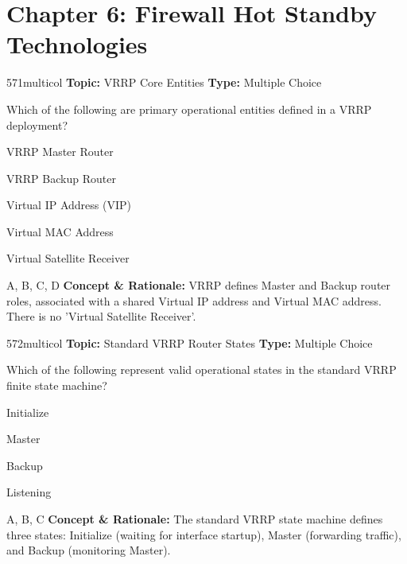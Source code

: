 \section{Chapter 6: Firewall Hot Standby Technologies}

\begin{qcard}{571}{multicol}
\textcolor{darkslate!75}{\small\textbf{Topic:} VRRP Core Entities \hfill \textbf{Type:} Multiple Choice}\vspace{0.4em}\par
Which of the following are primary operational entities defined in a VRRP deployment?
\begin{qoptions}
\item VRRP Master Router
\item VRRP Backup Router
\item Virtual IP Address (VIP)
\item Virtual MAC Address
\item Virtual Satellite Receiver
\end{qoptions}
\end{qcard}
\nopagebreak
\begin{explainbox}{A, B, C, D}
\textbf{Concept \& Rationale:} VRRP defines Master and Backup router roles, associated with a shared Virtual IP address and Virtual MAC address. There is no 'Virtual Satellite Receiver'.
\end{explainbox}

\begin{qcard}{572}{multicol}
\textcolor{darkslate!75}{\small\textbf{Topic:} Standard VRRP Router States \hfill \textbf{Type:} Multiple Choice}\vspace{0.4em}\par
Which of the following represent valid operational states in the standard VRRP finite state machine?
\begin{qoptions}
\item Initialize
\item Master
\item Backup
\item Listening
\end{qoptions}
\end{qcard}
\nopagebreak
\begin{explainbox}{A, B, C}
\textbf{Concept \& Rationale:} The standard VRRP state machine defines three states: Initialize (waiting for interface startup), Master (forwarding traffic), and Backup (monitoring Master).
\end{explainbox}

